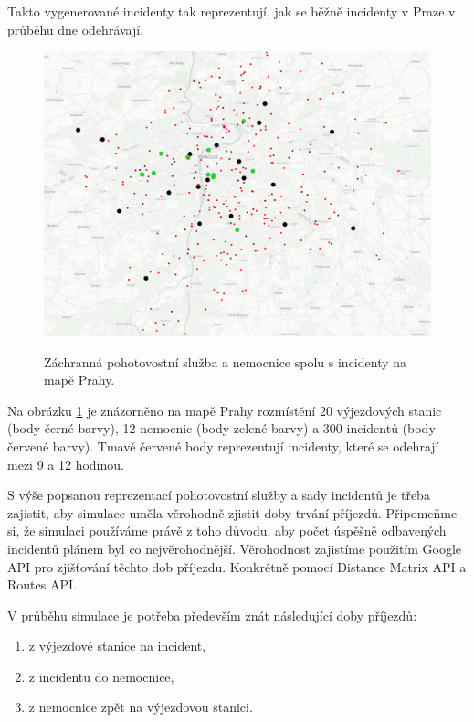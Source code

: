 Takto vygenerované incidenty tak reprezentují, jak se běžně incidenty v Praze v průběhu dne odehrávají.

\begin{figure}[H]
  \caption{Záchranná pohotovostní služba a nemocnice spolu s incidenty na mapě Prahy.}
  \includegraphics[width=\textwidth]{img/prague_monday_420.png}
  \centering
  \label{img:prague}
\end{figure}

Na obrázku \ref{img:prague} je znázorněno na mapě Prahy rozmístění 20 výjezdových stanic (body černé barvy), 12 nemocnic (body zelené barvy) a 300 incidentů (body červené barvy).
Tmavě červené body reprezentují incidenty, které se odehrají mezi 9 a 12 hodinou.

S výše popsanou reprezentací pohotovostní služby a sady incidentů je třeba zajistit, aby simulace uměla věrohodně zjistit doby trvání příjezdů.
Připomeňme si, že simulaci používáme právě z toho důvodu, aby počet úspěšně odbavených incidentů plánem byl co nejvěrohodnější.
Věrohodnost zajistíme použitím Google API pro zjišťování těchto dob příjezdu. Konkrétně pomocí Distance Matrix API a Routes API.

V průběhu simulace je potřeba především znát následující doby příjezdů:
\begin{enumerate}
  \item z výjezdové stanice na incident,
  \item z incidentu do nemocnice,
  \item z nemocnice zpět na výjezdovou stanici.
\end{enumerate}

